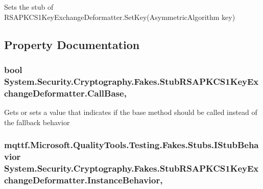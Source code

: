 Sets the stub of R\-S\-A\-P\-K\-C\-S1\-Key\-Exchange\-Deformatter.\-Set\-Key(\-Asymmetric\-Algorithm key)



\subsection{Property Documentation}
\hypertarget{class_system_1_1_security_1_1_cryptography_1_1_fakes_1_1_stub_r_s_a_p_k_c_s1_key_exchange_deformatter_a47095351991f608f3123dc84606286ac}{
\subsubsection[{Call\-Base}]{\setlength{\rightskip}{0pt plus 5cm}bool System.\-Security.\-Cryptography.\-Fakes.\-Stub\-R\-S\-A\-P\-K\-C\-S1\-Key\-Exchange\-Deformatter.\-Call\-Base\hspace{0.3cm}{\ttfamily [get]}, {\ttfamily [set]}}}\label{class_system_1_1_security_1_1_cryptography_1_1_fakes_1_1_stub_r_s_a_p_k_c_s1_key_exchange_deformatter_a47095351991f608f3123dc84606286ac}


Gets or sets a value that indicates if the base method should be called instead of the fallback behavior

\hypertarget{class_system_1_1_security_1_1_cryptography_1_1_fakes_1_1_stub_r_s_a_p_k_c_s1_key_exchange_deformatter_a70b3f612c2729929760994c428d23d6a}{
\subsubsection[{Instance\-Behavior}]{\setlength{\rightskip}{0pt plus 5cm}mqttf.\-Microsoft.\-Quality\-Tools.\-Testing.\-Fakes.\-Stubs.\-I\-Stub\-Behavior System.\-Security.\-Cryptography.\-Fakes.\-Stub\-R\-S\-A\-P\-K\-C\-S1\-Key\-Exchange\-Deformatter.\-Instance\-Behavior\hspace{0.3cm}{\ttfamily [get]}, {\ttfamily [set]}}}\label{class_system_1_1_security_1_1_cryptography_1_1_fakes_1_1_stub_r_s_a_p_k_c_s1_key_exchange_deformatter_a70b3f612c2729929760994c428d23d6a}



